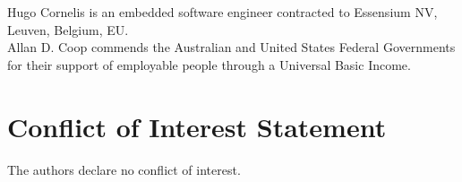 \documentclass[11pt,3p,twocolumn]{JMN}
\begin{document}
Hugo Cornelis is an embedded software engineer contracted to Essensium NV, Leuven, Belgium, EU.\\
Allan D. Coop commends the Australian and United States Federal Governments for their support of employable people through a Universal Basic Income.


\section{Conflict of Interest Statement}

The authors declare no conflict of interest.



\end{document}
